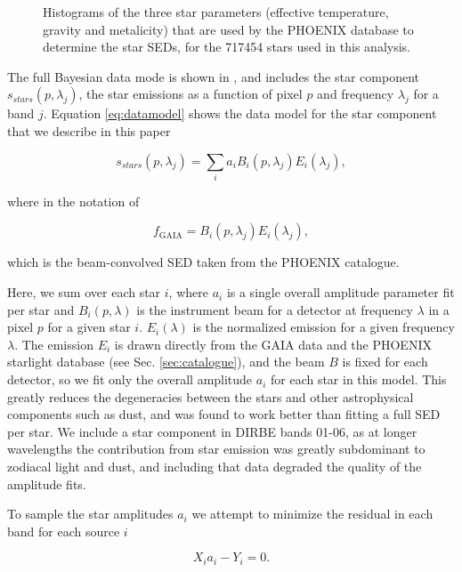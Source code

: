 \documentclass{aa}
\begin{document}
\begin{figure}
  \caption{Histograms of the three star parameters (effective temperature, gravity and metalicity) that are used by the PHOENIX database to determine the star SEDs, for the 717454 stars used in this analysis.}
  \label{fig:gaiacat}
\end{figure}

The full Bayesian data mode is shown in \cite{CG02_01}, and includes the star component $s_{stars}(p, \lambda_j)$, the star emissions as a function of pixel $p$ and frequency $\lambda_j$ for a band $j$. Equation \ref{eq:datamodel} shows the data model for the star component that we describe in this paper


\begin{equation}
s_{stars}(p, \lambda_j) = \sum_i a_i B_i(p, \lambda_j) E_i(\lambda_j),
\label{eq:datamodel}
\end{equation}

where in the notation of \cite{CG02_01} 

\begin{equation}
f_{\mathrm{GAIA}} = B_i(p, \lambda_j) E_i(\lambda_j),
\end{equation}

which is the beam-convolved SED taken from the PHOENIX catalogue.

Here, we sum over each star $i$, where $a_i$ is a single overall amplitude parameter fit per star and $B_i(p, \lambda)$ is the instrument beam for a detector at frequency $\lambda$ in a pixel $p$ for a given star $i$. $E_i(\lambda)$ is the normalized emission for a given frequency $\lambda$. The emission $E_i$ is drawn directly from the GAIA data and the PHOENIX starlight database (see Sec. \ref{sec:catalogue}), and the beam $B$ is fixed for each detector, so we fit only the overall amplitude $a_i$ for each star in this model. This greatly reduces the degeneracies between the stars and other astrophysical components such as dust, and was found to work better than fitting a full SED per star. We include a star component in DIRBE bands 01-06, as at longer wavelengths the contribution from star emission was greatly subdominant to zodiacal light and dust, and including that data degraded the quality of the amplitude fits. 

To sample the star amplitudes $a_i$ we attempt to minimize the residual in each band for each source $i$

\begin{equation}
\label{eq:minimize}
X_ia_i - Y_i = 0.
\end{equation}
\end{document}
